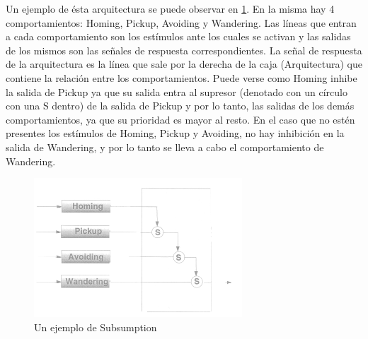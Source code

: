 Un ejemplo de \'esta arquitectura se puede observar en \ref{fig:subsumptionExample}. En la misma hay 4 comportamientos:
Homing, Pickup, Avoiding y Wandering. Las l\'ineas que entran a cada comportamiento son los est\'imulos ante los cuales
se activan y las salidas de los mismos son las se\~nales de respuesta correspondientes. La se\~nal de respuesta de la arquitectura
es la l\'inea que sale por la derecha de la caja (Arquitectura) que contiene la relaci\'on entre los comportamientos.
Puede verse como Homing inhibe la salida de Pickup ya que su salida entra al supresor (denotado con un c\'irculo con una S dentro)
de la salida de Pickup y por lo tanto, las salidas de los dem\'as comportamientos, ya que su prioridad es mayor al resto. En el
caso que no est\'en presentes los est\'imulos de Homing, Pickup y Avoiding, no hay inhibici\'on en la salida de Wandering, y por lo
tanto se lleva a cabo el comportamiento de Wandering.
\begin{figure}[htp]
\begin{center}
\includegraphics[scale=1.0]{comportamientos/subsumptionExample.png}
\caption{Un ejemplo de Subsumption}
\label{fig:subsumptionExample}
\end{center}
\end{figure}


\newpage


\newpage

